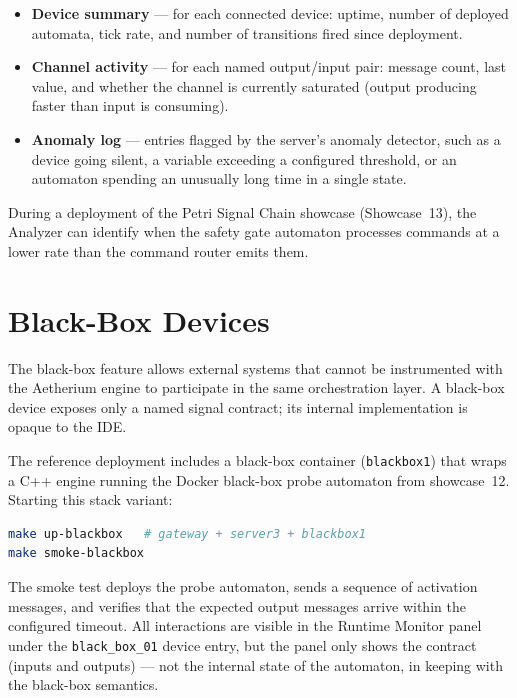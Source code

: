 \begin{itemize}
  \item \textbf{Device summary} --- for each connected device: uptime, number
    of deployed automata, tick rate, and number of transitions fired since
    deployment.
  \item \textbf{Channel activity} --- for each named output/input pair: message
    count, last value, and whether the channel is currently saturated (output
    producing faster than input is consuming).
  \item \textbf{Anomaly log} --- entries flagged by the server's anomaly
    detector, such as a device going silent, a variable exceeding a configured
    threshold, or an automaton spending an unusually long time in a single
    state.
\end{itemize}

\noindent During a deployment of the Petri Signal Chain showcase (Showcase~13),
the Analyzer can identify when the safety gate automaton processes commands at a
lower rate than the command router emits them.

\section{Black-Box Devices}
\label{sec:demo-blackbox}

The black-box feature allows external systems that cannot be instrumented with the Aetherium engine to participate in the same orchestration layer. A black-box device exposes only a named signal contract; its internal implementation is opaque to the IDE.

The reference deployment includes a black-box container (\texttt{blackbox1}) that wraps a C++ engine running the Docker black-box probe automaton from showcase~12. Starting this stack variant:

\begin{lstlisting}[language=bash,
  caption={Starting the black-box demonstration stack.}]
make up-blackbox   # gateway + server3 + blackbox1
make smoke-blackbox
\end{lstlisting}

\noindent The smoke test deploys the probe automaton, sends a sequence of
activation messages, and verifies that the expected output messages arrive within
the configured timeout. All interactions are visible in the Runtime Monitor
panel under the \texttt{black\_box\_01} device entry, but the panel only shows
the contract (inputs and outputs) — not the internal state of the automaton, in
keeping with the black-box semantics.

